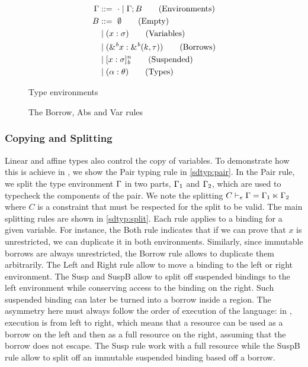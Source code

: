 \begin{figure}[!h]
  \begin{minipage}{0.33\linewidth}
    \begin{align*}
      \Gamma &::=\ \cdot \mid \Gamma;B\tag{Environments}\\
      B &::=\ \emptyset \tag{Empty} \\
         &\mid (x : \sigma)\tag{Variables}\\
         &\mid ({\&}^{\textit{b}}x : {\&}^{\textit{b}}(k,\tau))\tag{Borrows}\\
         &\mid [x : \sigma]_{\textit{b}}^n \tag{Suspended}\\
         &\mid (\alpha : \theta)\tag{Types}
    \end{align*}
    \caption{Type environments}
    \label{grammar:env}
  \end{minipage}\hfill
  \begin{minipage}{0.65\linewidth}
    \caption{The {\sc Borrow}, {\sc Abs} and {\sc Var} rules}
    \label{selectrules:borrow}
    \label{selectrules:binders}
  \end{minipage}
\end{figure}



\subsubsection{Copying and Splitting}

Linear and affine types also control the copy of variables.
To demonstrate how this is achieve in \lang, we show the
{\sc Pair} typing rule in \cref{sdtyp:pair}.
In the {\sc Pair} rule, we split the type environment $\Gamma$ in two parts,
$\Gamma_1$ and $\Gamma_2$, which are used to typecheck the components of the pair.
We note the splitting $C \vdash_e \Gamma = \Gamma_1 \ltimes \Gamma_2$ where $C$ is a constraint
that must be respected for the split to be valid.
The main splitting rules are shown in \cref{sdtyp:split}. Each
rule applies to a binding for a given variable. For instance, the
{\sc Both} rule indicates that if we can prove that $x$ is unrestricted, we
can duplicate it in both environments.
Similarly, since immutable borrows are always unrestricted, the
{\sc Borrow} rule allows to duplicate them arbitrarily.
The {\sc Left} and {\sc Right} rule allow to move a binding
to the left or right environment.
The {\sc Susp} and {\sc SuspB} allow to split off suspended bindings to
the left environment while conserving access to the binding on the right.
Such suspended binding can later be turned
into a borrow inside a region. The asymmetry here must always follow
the order of execution of the language: in \affe, execution is from left to
right, which means that a resource can be used as a borrow on the left
and then as a full resource on the right, assuming that the borrow does not
escape. The {\sc Susp} rule work with a full resource while the {\sc SuspB}
rule allow to split off an immutable suspended binding based off a borrow.

